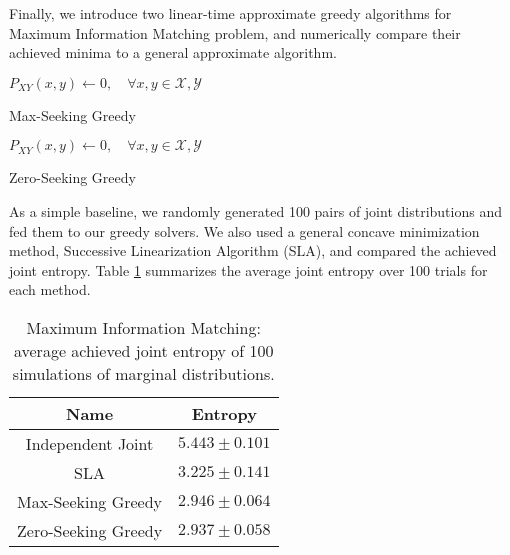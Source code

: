 Finally, we introduce two linear-time approximate greedy algorithms for Maximum Information Matching problem, and numerically compare their achieved minima to a general approximate algorithm.

\begin{algorithm}[H]
$P_{XY}(x, y) \gets 0, \quad \forall x, y \in \mathcal{X}, \mathcal{Y}$ \; 
 \caption{Max-Seeking Greedy}
\end{algorithm}

\begin{algorithm}[H]
$P_{XY}(x, y) \gets 0, \quad \forall x, y \in \mathcal{X}, \mathcal{Y}$ \; 
\caption{Zero-Seeking Greedy}
\end{algorithm}

As a simple baseline, we randomly generated 100 pairs of joint distributions and fed them to our greedy solvers. We also used a general concave minimization method, Successive Linearization Algorithm (SLA), and compared the achieved joint entropy. Table \ref{table:maxIresult} summarizes the average joint entropy over 100 trials for each method.

\begin{table}[h]
\center
\caption{Maximum Information Matching: average achieved joint entropy of 100 simulations of marginal distributions.}
\begin{tabular}{ |c|c| }
 \hline
 Name & Entropy  \\ 
 \hline
 Independent Joint & $5.443 \pm 0.101$  \\ 
 SLA & $3.225 \pm 0.141$\\ 
 Max-Seeking Greedy & $2.946 \pm 0.064$\\
 Zero-Seeking Greedy & $2.937 \pm 0.058$\\
 \hline
\end{tabular}
\label{table:maxIresult}
\end{table}


